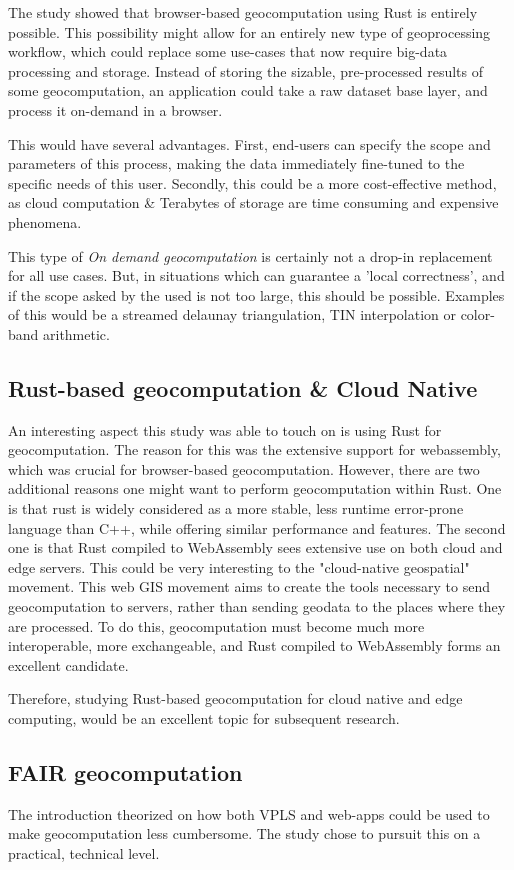 The study showed that browser-based geocomputation using Rust is entirely possible. 
This possibility might allow for an entirely new type of geoprocessing workflow, which could replace some use-cases that now require big-data processing and storage.
Instead of storing the sizable, pre-processed results of some geocomputation, an application could take a raw dataset base layer, and process it on-demand in a browser.

This would have several advantages. 
First, end-users can specify the scope and parameters of this process, making the data immediately fine-tuned to the specific needs of this user. 
Secondly, this could be a more cost-effective method, as cloud computation \& Terabytes of storage are time consuming and expensive phenomena.

This type of \emph{On demand geocomputation} is certainly not a drop-in replacement for all use cases. 
But, in situations which can guarantee a 'local correctness', and if the scope asked by the used is not too large, this should be possible. 
Examples of this would be a streamed delaunay triangulation, TIN interpolation or color-band arithmetic. 

\subsection{Rust-based geocomputation \& Cloud Native}
An interesting aspect this study was able to touch on is using Rust for geocomputation.
The reason for this was the extensive support for webassembly, which was crucial for browser-based geocomputation. 
However, there are two additional reasons one might want to perform geocomputation within Rust.
One is that rust is widely considered as a more stable, less runtime error-prone language than C++, while offering similar performance and features. 
The second one is that Rust compiled to WebAssembly sees extensive use on both cloud and edge servers.  
This could be very interesting to the "cloud-native geospatial" movement. 
This web GIS movement aims to create the tools necessary to send geocomputation to servers, rather than sending geodata to the places where they are processed.
To do this, geocomputation must become much more interoperable, more exchangeable, and Rust compiled to WebAssembly forms an excellent candidate. 

Therefore, studying Rust-based geocomputation for cloud native and edge computing, would be an excellent topic for subsequent research. 

\subsection{FAIR geocomputation}
The introduction theorized on how both VPLS and web-apps could be used to make geocomputation less cumbersome.
The study chose to pursuit this on a practical, technical level. 


